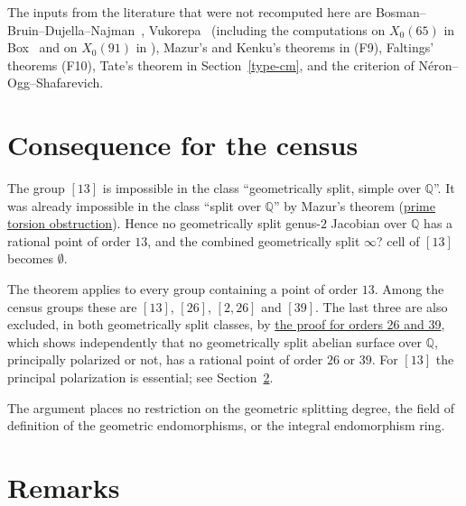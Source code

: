 \documentclass[11pt]{article}
\newcommand{\Q}{\mathbb Q}
\begin{document}
The inputs from the literature that were not recomputed here are
      Bosman--Bruin--Dujella--Najman~\cite[Theorem 11(1), Lemmas 12 and 13]{BBDN}, Vukorepa~\cite[Theorem 1]{Vuk} (including the computations
      on \(X_0(65)\) in Box~\cite[§4.5]{Box} and on \(X_0(91)\) in \cite[§13]{Vuk}), Mazur's and Kenku's
      theorems in (F9), Faltings' theorems (F10), Tate's theorem in Section~\ref{type-cm}, and the criterion of
      Néron--Ogg--Shafarevich.

\section{Consequence for the census}\label{census}

The group \href{https://genus-2-torsion.github.io/group.html?g=13}{\([13]\)} is impossible in the class ``geometrically split, simple over \(\Q\)''. It was
      already impossible in the class ``split over \(\Q\)'' by Mazur's theorem
      (\href{https://genus-2-torsion.github.io/proofs/qsplit-prime-obstruction.html}{prime torsion obstruction}). Hence no geometrically split
      genus-\(2\) Jacobian over \(\Q\) has a rational point of order \(13\), and the combined geometrically
      split \(\infty\)? cell of \href{https://genus-2-torsion.github.io/group.html?g=13}{\([13]\)} becomes \(\emptyset\).

The theorem applies to every group containing a point of order \(13\). Among the census groups these
      are \href{https://genus-2-torsion.github.io/group.html?g=13}{\([13]\)}, \href{https://genus-2-torsion.github.io/group.html?g=26}{\([26]\)}, \href{https://genus-2-torsion.github.io/group.html?g=2.26}{\([2,26]\)} and \href{https://genus-2-torsion.github.io/group.html?g=39}{\([39]\)}. The last three are also excluded, in both geometrically
      split classes, by \href{https://genus-2-torsion.github.io/proofs/geometric-26-39-obstruction.html}{the proof for orders 26 and 39}, which shows
      independently that no geometrically split abelian surface over \(\Q\), principally polarized or not,
      has a rational point of order \(26\) or \(39\). For \href{https://genus-2-torsion.github.io/group.html?g=13}{\([13]\)} the principal polarization is essential;
      see Section~\ref{remarks}.

The argument places no restriction on the geometric splitting degree, the field of definition of
      the geometric endomorphisms, or the integral endomorphism ring.

\section{Remarks}\label{remarks}
\end{document}
